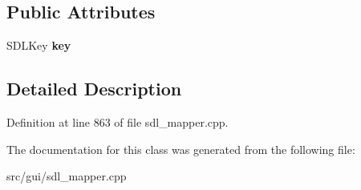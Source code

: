 \subsection*{Public Attributes}
\begin{DoxyCompactItemize}
\item 
\hypertarget{classCKeyBind_a5db2e06f00521cdcd4bdf961cb02c336}{S\-D\-L\-Key {\bfseries key}}\label{classCKeyBind_a5db2e06f00521cdcd4bdf961cb02c336}

\end{DoxyCompactItemize}


\subsection{Detailed Description}


Definition at line 863 of file sdl\-\_\-mapper.\-cpp.



The documentation for this class was generated from the following file\-:\begin{DoxyCompactItemize}
\item 
src/gui/sdl\-\_\-mapper.\-cpp\end{DoxyCompactItemize}
